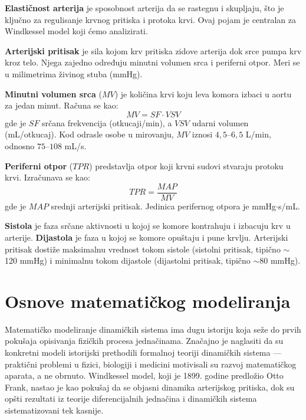 \documentclass[12pt,a4paper]{article}
\begin{document}
\textbf{Elastičnost arterija} je sposobnost arterija da se rastegnu i skupljaju, što je ključno za regulisanje krvnog pritiska i protoka krvi. Ovaj pojam je centralan za Windkessel model koji ćemo analizirati.

\textbf{Arterijski pritisak} je sila kojom krv pritiska zidove arterija dok srce pumpa krv kroz telo. Njega zajedno određuju minutni volumen srca i periferni otpor. Meri se u milimetrima živinog stuba (mmHg).

\textbf{Minutni volumen srca} ($MV$) je količina krvi koju leva komora izbaci u aortu za jedan minut. Računa se kao:
\begin{equation}
    MV = SF \cdot VSV
\end{equation}
gde je $SF$ srčana frekvencija (otkucaji/min), a $VSV$ udarni volumen (mL/otkucaj). Kod odrasle osobe u mirovanju, $MV$ iznosi $4{,}5$--$6{,}5$ L/min, odnosno $75$--$108$ mL/s.

\textbf{Periferni otpor} ($TPR$) predstavlja otpor koji krvni sudovi stvaraju protoku krvi. Izračunava se kao:
\begin{equation}
    TPR = \frac{MAP}{MV}
\end{equation}
gde je $MAP$ srednji arterijski pritisak. Jedinica perifernog otpora je mmHg$\cdot$s/mL.

\textbf{Sistola} je faza srčane aktivnosti u kojoj se komore kontrahuju i izbacuju krv u arterije. \textbf{Dijastola} je faza u kojoj se komore opuštaju i pune krvlju. Arterijski pritisak dostiže maksimalnu vrednost tokom sistole (sistolni pritisak, tipično $\sim$120 mmHg) i minimalnu tokom dijastole (dijastolni pritisak, tipično $\sim$80 mmHg).

\section{Osnove matematičkog modeliranja}

Matematičko modeliranje dinamičkih sistema ima dugu istoriju koja seže do prvih pokušaja opisivanja fizičkih procesa jednačinama. Značajno je naglasiti da su konkretni modeli istorijski prethodili formalnoj teoriji dinamičkih sistema --- praktični problemi u fizici, biologiji i medicini motivisali su razvoj matematičkog aparata, a ne obrnuto. Windkessel model, koji je 1899. godine predložio Otto Frank, nastao je kao pokušaj da se objasni dinamika arterijskog pritiska, dok su opšti rezultati iz teorije diferencijalnih jednačina i dinamičkih sistema sistematizovani tek kasnije.
\end{document}
